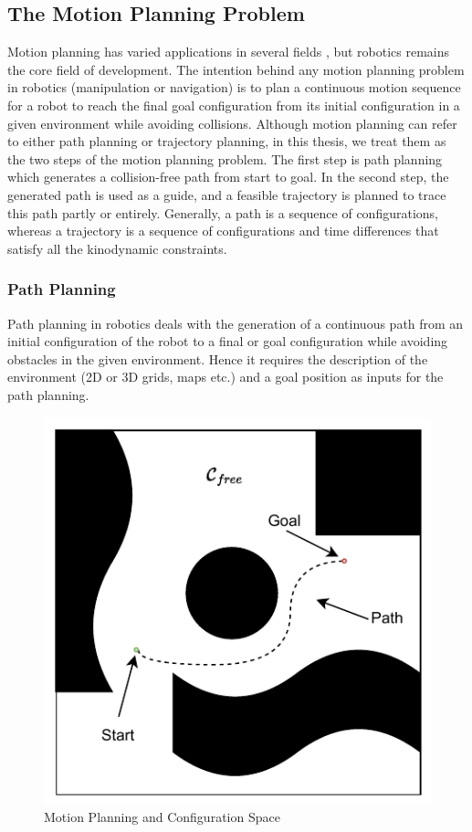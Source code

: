 \subsection{The Motion Planning Problem}
Motion planning has varied applications in several fields \cite{latombe1999motion}, but robotics remains the core field of development. The intention behind any motion planning problem in robotics (manipulation or navigation) is to plan a continuous motion sequence for a robot to reach the final goal configuration from its initial configuration in a given environment while avoiding collisions. Although motion planning can refer to either path planning or trajectory planning, in this thesis, we treat them as the two steps of the motion planning problem. The first step is path planning which generates a collision-free path from start to goal. In the second step, the generated path is used as a guide, and a feasible trajectory is planned to trace this path partly or entirely. Generally, a path is a sequence of configurations, whereas a trajectory is a sequence of configurations and time differences that satisfy all the kinodynamic constraints. 

\subsubsection{Path Planning}
Path planning in robotics deals with the generation of a continuous path from an initial configuration of the robot to a final or goal configuration while avoiding obstacles in the given environment. Hence it requires the description of the environment (2D or 3D grids, maps etc.) and a goal position as inputs for the path planning.

\begin{figure}[h!]
    \centering
    \includegraphics[width=0.45\columnwidth]{images/config_space.pdf}
    \caption{Motion Planning and Configuration Space}
    \label{fig:config_space}
\end{figure}

